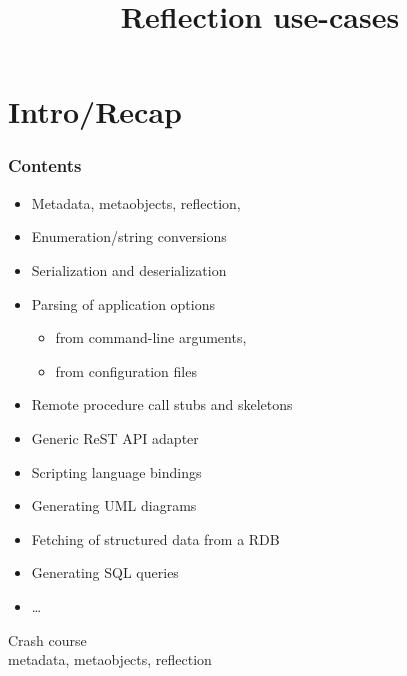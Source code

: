 \documentclass[compress,table,xcolor=table]{beamer}
\begin{document}
\title{Reflection use-cases}
\section{Intro/Recap}
\begin{frame}
  \frametitle{Contents}
  \begin{itemize}
    \item Metadata, metaobjects, reflection, 
    \item Enumeration/string conversions
    \item Serialization and deserialization
    \item Parsing of application options 
    \begin{itemize}
      \smaller
      \item from command-line arguments,
      \item from configuration files
    \end{itemize}
    \item Remote procedure call stubs and skeletons
    \item Generic ReST API adapter
    \item Scripting language bindings
    \item Generating UML diagrams
    \item Fetching of structured data from a RDB
    \item Generating SQL queries
    \item \ldots
  \end{itemize}
\end{frame}
\begin{frame}[c]
  \Huge
  \centering
  Crash course\\
  \large
  metadata, metaobjects, reflection
\end{frame}
\end{document}
